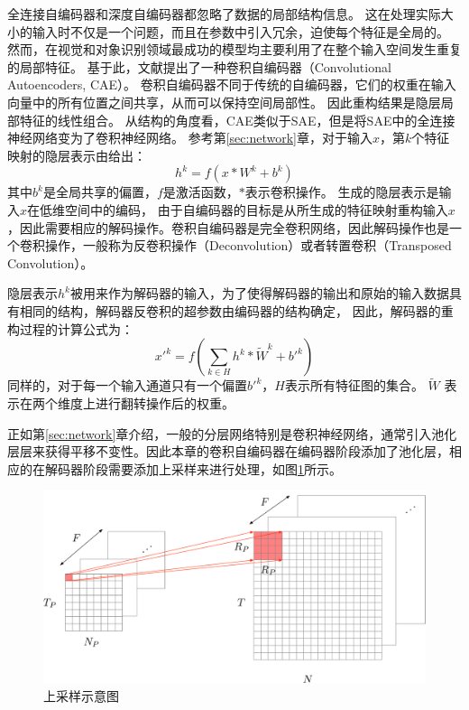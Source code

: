 全连接自编码器和深度自编码器都忽略了数据的局部结构信息。
这在处理实际大小的输入时不仅是一个问题，而且在参数中引入冗余，迫使每个特征是全局的。
然而，在视觉和对象识别领域最成功的模型均主要利用了在整个输入空间发生重复的局部特征。
基于此，文献\cite{masci2011stacked}提出了一种卷积自编码器（Convolutional Autoencoders, CAE）。
卷积自编码器不同于传统的自编码器，它们的权重在输入向量中的所有位置之间共享，从而可以保持空间局部性。
因此重构结果是隐层局部特征的线性组合。
从结构的角度看，CAE类似于SAE，但是将SAE中的全连接神经网络变为了卷积神经网络。
参考第\ref{sec:network}章，对于输入$x$，第$k$个特征映射的隐层表示由给出：
\begin{equation}
	h^k=f(x*W^k+b^k)
	\label{equ:cae1}
\end{equation}
其中$b^k$是全局共享的偏置，$f$是激活函数，$*$表示卷积操作。
生成的隐层表示是输入$x$在低维空间中的编码，
由于自编码器的目标是从所生成的特征映射重构输入$x$，因此需要相应的解码操作。卷积自编码器是完全卷积网络，因此解码操作也是一个卷积操作，一般称为反卷积操作（Deconvolution）或者转置卷积（Transposed Convolution）。

隐层表示$h^k$被用来作为解码器的输入，为了使得解码器的输出和原始的输入数据具有相同的结构，解码器反卷积的超参数由编码器的结构确定，
因此，解码器的重构过程的计算公式为：
\begin{equation}
	x'^k=f(\sum_{k \in H}h^k * \tilde{W}^k + b'^k)
	\label{equ:cae2}
\end{equation}
同样的，对于每一个输入通道只有一个偏置$b'^k$，$H$表示所有特征图的集合。
$\tilde{W}$ 表示在两个维度上进行翻转操作后的权重。


正如第\ref{sec:network}章介绍，一般的分层网络特别是卷积神经网络，通常引入池化层层来获得平移不变性。因此本章的卷积自编码器在编码器阶段添加了池化层，相应的在解码器阶段需要添加上采样来进行处理，如图\ref{fig:unpool}所示。

\begin{figure}[hbt]
	\centering
	\includegraphics[width=13.5cm]{figures/AE/unpool}
	\caption{上采样示意图}
	\label{fig:unpool}
\end{figure}

